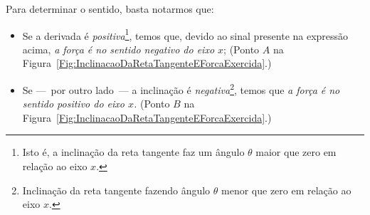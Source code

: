 Para determinar o sentido, basta notarmos que:
\begin{itemize}
    \item Se a derivada é \emph{positiva}\footnote[][-6cm]{Isto é, a inclinação da reta tangente faz um ângulo $\theta$ maior que zero em relação ao eixo $x$.}, temos que, devido ao sinal presente na expressão acima, \emph{a força é no sentido negativo do eixo $x$}; (Ponto $A$ na Figura~\ref{Fig:InclinacaoDaRetaTangenteEForcaExercida}.)
    \item Se ---~por outro lado~--- a inclinação é \emph{negativa}\footnote[][-6cm]{Inclinação da reta tangente fazendo ângulo $\theta$ menor que zero em relação ao eixo $x$.}, temos que \emph{a força é no sentido positivo do eixo $x$.} (Ponto $B$ na Figura~\ref{Fig:InclinacaoDaRetaTangenteEForcaExercida}.)
\end{itemize}


